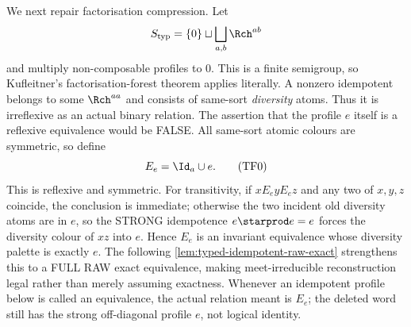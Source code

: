 We next repair factorisation compression.  Let
\[
 S_{\rm typ}=\{0\}\sqcup\bigsqcup_{a,b}\Rch^{ab}
\]
and multiply non-composable profiles to \(0\).  This is a finite semigroup, so
Kufleitner's factorisation-forest theorem applies literally.  A nonzero idempotent belongs to some
\(\Rch^{aa}\) and consists of same-sort
\emph{diversity} atoms. Thus it is irreflexive
as an actual binary relation. The assertion that
the profile \(e\) itself is a reflexive equivalence
would be FALSE. All same-sort atomic colours are
symmetric, so define
\[
                 E_e=\Id_a\cup e.
\tag{TF0}\label{eq:typed-idempotent-equivalence}
\]
This is reflexive and symmetric. For transitivity,
if \(xE_eyE_ez\) and any two of \(x,y,z\)
coincide, the conclusion is immediate; otherwise
the two incident old diversity atoms are in \(e\),
so the STRONG idempotence \(e\starprod e=e\)
forces the diversity colour of \(xz\) into \(e\).
Hence \(E_e\) is an invariant equivalence whose
diversity palette is exactly \(e\).
The following
\cref{lem:typed-idempotent-raw-exact}
strengthens this to a FULL RAW exact
equivalence, making meet-irreducible
reconstruction legal rather than merely
assuming exactness.
Whenever an idempotent profile below is called
an equivalence, the actual relation meant is \(E_e\);
the deleted word still has the strong off-diagonal
profile \(e\), not logical identity.

